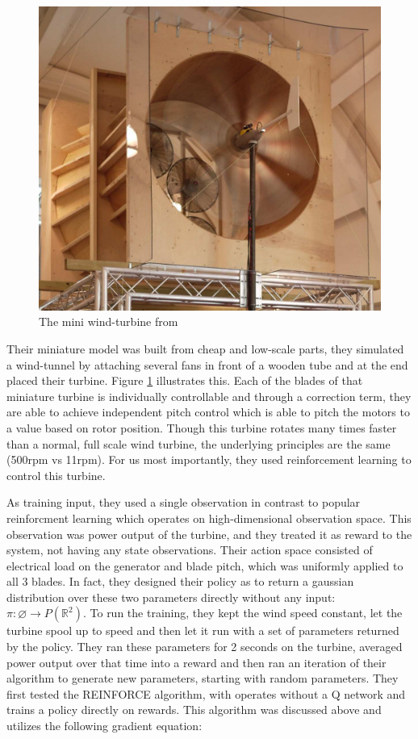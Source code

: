 \documentclass[hyperref,beleg]{cgvpub}
\begin{document}
\begin{figure}
  \centering
  \includegraphics[width=0.5\linewidth]{images/Miniturbine.png}
  \caption{The mini wind-turbine from \cite{kolterDesignAnalysisLearning2012}}
  \label{fig:miniturbine}
\end{figure}

Their miniature model was built from cheap and low-scale parts, they simulated a wind-tunnel by attaching several fans in front of a wooden tube and at the end placed their turbine. Figure \ref{fig:miniturbine} illustrates this. Each of the blades of that miniature turbine is individually controllable and through a correction term, they are able to achieve independent pitch control which is able to pitch the motors to a value based on rotor position. Though this turbine rotates many times faster than a normal, full scale wind turbine, the underlying principles are the same (500rpm vs 11rpm). For us most importantly, they used reinforcement learning to control this turbine.

As training input, they used a single observation in contrast to popular reinforcment learning which operates on high-dimensional observation space. This observation was power output of the turbine, and they treated it as reward to the system, not having any state observations. Their action space consisted of electrical load on the generator and blade pitch, which was uniformly applied to all 3 blades. In fact, they designed their policy as to return a gaussian distribution over these two parameters directly without any input: $\pi: \varnothing \rightarrow P(\mathbb{R}^2)$. To run the training, they kept the wind speed constant, let the turbine spool up to speed and then let it run with a set of parameters returned by the policy. They ran these parameters for 2 seconds on the turbine, averaged power output over that time into a reward and then ran an iteration of their algorithm to generate new parameters, starting with random parameters. 
They first tested the \ac{REINFORCE} algorithm, with operates without a Q network and trains a policy directly on rewards. This algorithm was discussed above and utilizes the following gradient equation:
\end{document}
